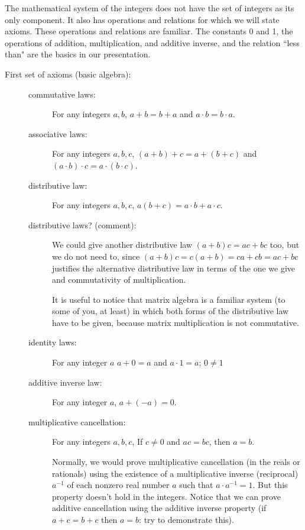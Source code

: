 \documentclass[12pt]{article}
\begin{document}
The mathematical system of the integers does not have the set of integers as its only component.  It also has operations and relations for which we will state axioms.  These operations and relations are familiar.  The constants 0 and 1, the operations of addition, multiplication, and additive inverse, and the relation ``less than" are the basics in our presentation.

\begin{description}

\item[First set of axioms (basic algebra):]

\begin{description}

\item[commutative laws:]  For any integers $a,b$, $a+b=b+a$ and $a\cdot b = b \cdot a$.

\item[associative laws:]  For any integers $a,b,c$, $(a+b)+c = a +(b+c)$ and $(a \cdot b) \cdot c = a \cdot (b \cdot c)$.

\item[distributive law:]  For any integers $a,b,c$, $a(b+c) = a\cdot b + a\cdot c$.

\item[distributive laws?  (comment):]  We could give another distributive law $(a+b)c = ac+bc$ too, but we do not need to, since $(a+b)c = c(a+b) = ca+cb = ac+bc$ justifies the alternative distributive law in terms of the one we give and commutativity of multiplication.

It is useful to notice that matrix algebra is a familiar system (to some of you, at least) in which both forms of the distributive law have to be given, because matrix multiplication is not commutative.

\item[identity laws:]  For any integer $a$ $a+0=a$ and $a \cdot 1 = a$; $0 \neq 1$

\item[additive inverse law:]  For any integer $a$, $a+(-a)=0$.

\item[multiplicative cancellation:]  For any integers $a,b,c$, If $c \neq 0$ and $ac=bc$, then $a=b$.

Normally, we would prove multiplicative cancellation (in the reals or rationals) using the existence of a multiplicative inverse (reciprocal)
$a^{-1}$ of each nonzero real number $a$ such that $a \cdot a^{-1}=1$.  But this property doesn't hold in the integers.
Notice that we can prove additive cancellation using the additive inverse property (if $a+c = b+c$ then $a=b$:  try to demonstrate this).


\end{description}
\end{description}
\end{document}
